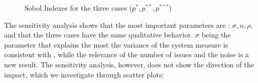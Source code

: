\documentclass{article}
\begin{document}
\begin{figure}[H]
\begin{subfigure}[b]{0.5\textwidth}
     \end{subfigure}
     \caption{Sobol Indexes for the three cases (\(p^{*}, p^{**}, p^{***}\))}
      \label{fig:sobolstuff}
    \end{figure}

    The sensitivity analysis shows that the most important parameters are :
    \(\sigma, n, \rho\), and that the three cases have the same qualitative
    behavior. \(\sigma\) being the parameter that explains the most the variance
    of the system measure is consistent with \citep{martins12b}, while the
    relevance of the number of issues and the noise is a new result. The
    sensitivity analysis, however, does not show the direction of the impact,
    which we investigate through scatter plots:

        \begin{figure}[H]
  \centering
  

\end{figure}
\end{document}
